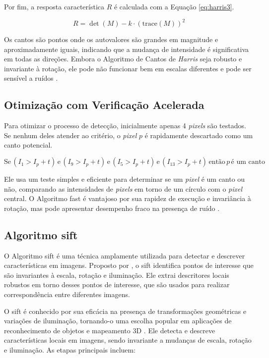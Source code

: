 Por fim, a resposta característica \( R \) é calculada com a Equação \ref{eq:harris3}.

\begin{equation}
   R = \det(M) - k \cdot (\text{trace}(M))^2
   \label{eq:harris3}
\end{equation}


Os cantos são pontos onde os autovalores são grandes em magnitude e aproximadamente iguais, indicando que a mudança de intensidade é significativa em todas as direções. Embora o Algoritmo de Cantos de \textit{Harris} seja robusto e invariante à rotação, ele pode não funcionar bem em escalas diferentes e pode ser sensível a ruídos \cite{vaghela2014review}.


\subsection*{Otimização com Verificação Acelerada}

Para otimizar o processo de detecção, inicialmente apenas 4 \textit{pixels} são testados. Se nenhum deles atender ao critério, o \textit{pixel} \( p \) é rapidamente descartado como um canto potencial.

\[
\text{Se} \, (I_1 > I_p + t) \, \text{e} \, (I_9 > I_p + t) \, \text{e} \, (I_5 > I_p + t) \, \text{e} \, (I_{13} > I_p + t) \, \text{então} \, p \, \text{é um canto}
\]

Ele usa um teste simples e eficiente para determinar se um \textit{pixel} é um canto ou não, comparando as intensidades de \textit{pixels} em torno de um círculo com o \textit{pixel} central. O Algoritmo \gls{fast} é vantajoso por sua rapidez de execução e invariância à rotação, mas pode apresentar desempenho fraco na presença de ruído \cite{vaghela2014review}.

\subsection{Algoritmo \gls{sift}}\label{}

O Algoritmo \gls{sift} é uma técnica amplamente utilizada para detectar e descrever características em imagens. Proposto por , o \gls{sift} identifica pontos de interesse que são invariantes à escala, rotação e iluminação. Ele extrai descritores locais robustos em torno desses pontos de interesse, que são usados para realizar correspondência entre diferentes imagens.

O \gls{sift} é conhecido por sua eficácia na presença de transformações geométricas e variações de iluminação, tornando-o uma escolha popular em aplicações de reconhecimento de objetos e mapeamento 3D \cite{vaghela2014review}. Ele detecta e descreve características locais em imagens, sendo invariante a mudanças de escala, rotação e iluminação. As etapas principais incluem:

